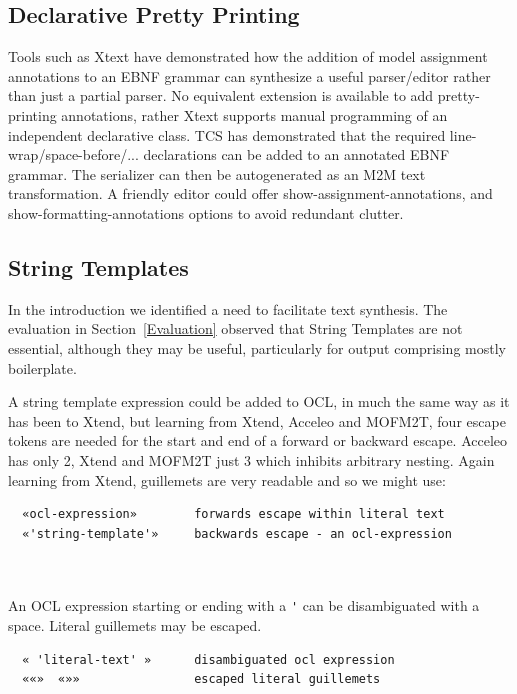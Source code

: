 \documentclass{llncs}
\begin{document}
\subsection{Declarative Pretty Printing}\label{Declarative Pretty Printing}

Tools such as Xtext have demonstrated how the addition of model assignment annotations to an EBNF grammar can synthesize a useful parser/editor rather than just a partial parser. No equivalent extension is available to add pretty-printing annotations, rather Xtext supports manual programming of an independent declarative class. TCS \cite{TCS} has demonstrated that the required line-wrap/space-before/... declarations can be added to an annotated EBNF grammar. The serializer can then be autogenerated as an M2M text transformation. A friendly editor could offer show-assignment-annotations, and show-formatting-annotations options to avoid redundant clutter.

\subsection{String Templates}\label{String Templates}

In the introduction we identified a need to facilitate text synthesis. The evaluation in Section~\ref{Evaluation} observed that String Templates are not essential, although they may be useful, particularly for output comprising mostly boilerplate.

A string template expression could be added to OCL, in much the same way as it has been to Xtend, 
but learning from Xtend, Acceleo and MOFM2T, four escape tokens are needed for the start and end of a forward or backward escape. Acceleo has only 2, Xtend and MOFM2T just 3 which inhibits arbitrary nesting. Again learning from Xtend, guillemets are very readable and so we might use:

\begin{verbatim}
  «ocl-expression»        forwards escape within literal text
  «'string-template'»     backwards escape - an ocl-expression
  
  

\end{verbatim}

An OCL expression starting or ending with a \verb|'| can be disambiguated with a space. Literal guillemets may be escaped.

\begin{verbatim}
  « 'literal-text' »      disambiguated ocl expression
  ««»  «»»                escaped literal guillemets
\end{verbatim}
\end{document}
